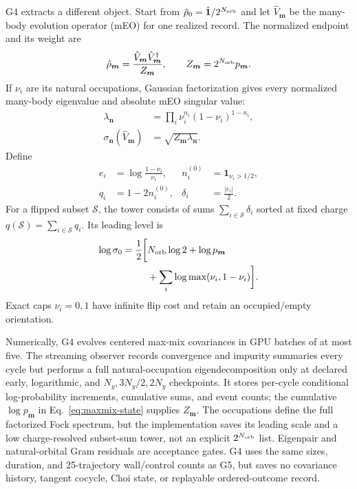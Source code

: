 \documentclass[aps,prx,twocolumn,superscriptaddress,longbibliography,nofootinbib,floatfix]{revtex4-2}
\begin{document}
G4 extracts a different object.  Start from
$\hat\rho_0=\hat{\mathbf{1}}/2^{N_{\rm orb}}$ and let
$\hat V_{\boldsymbol m}$ be the many-body evolution operator (mEO) for one realized
record.  The normalized endpoint and its weight are
\begin{equation}
 \hat\rho_{\boldsymbol m}
 =\frac{\hat V_{\boldsymbol m}\hat V_{\boldsymbol m}^\dagger}{Z_{\boldsymbol m}},
 \qquad
 Z_{\boldsymbol m}=2^{N_{\rm orb}}p_{\boldsymbol m}.
 \label{eq:maxmix-state}
\end{equation}
If $\nu_i$ are its natural occupations, Gaussian factorization gives every normalized
many-body eigenvalue and absolute mEO singular value:
\begin{align}
 \lambda_{\boldsymbol n}
 &=\prod_i\nu_i^{n_i}(1-\nu_i)^{1-n_i},\nonumber\\
 \sigma_{\boldsymbol n}(\hat V_{\boldsymbol m})
 &=\sqrt{Z_{\boldsymbol m}\lambda_{\boldsymbol n}}.
 \label{eq:maxmix-spectrum}
\end{align}
Define
\begin{align}
 e_i&=\log\frac{1-\nu_i}{\nu_i},&n_i^{(0)}&=\mathbf1_{\nu_i>1/2},\nonumber\\
 q_i&=1-2n_i^{(0)},&\delta_i&=\frac{|e_i|}{2}.
 \label{eq:operator-costs}
\end{align}
For a flipped subset $\mathcal S$, the tower consists of sums $\sum_{i\in\mathcal S}\delta_i$
sorted at fixed charge $q(\mathcal S)=\sum_{i\in\mathcal S}q_i$.  Its leading level is
\begin{align}
 \log\sigma_0=\frac12\biggl[&N_{\rm orb}\log2+\log p_{\boldsymbol m}\nonumber\\
 &+\sum_i\log\max(\nu_i,1-\nu_i)\biggr].
 \label{eq:leading-sigma}
\end{align}
Exact caps $\nu_i=0,1$ have infinite flip cost and retain an occupied/empty orientation.

Numerically, G4 evolves centered max-mix covariances in GPU batches of at most five.  The
streaming observer records convergence and impurity summaries every cycle but performs a
full natural-occupation eigendecomposition only at declared early, logarithmic, and
$N_y,3N_y/2,2N_y$ checkpoints.  It stores per-cycle conditional log-probability
increments, cumulative sums, and event counts; the cumulative $\log p_{\boldsymbol m}$ in
Eq.~\eqref{eq:maxmix-state} supplies $Z_{\boldsymbol m}$.  The occupations define the full
factorized Fock spectrum, but the implementation saves its leading scale and a low
charge-resolved subset-sum tower, not an explicit $2^{N_{\rm orb}}$ list.  Eigenpair and
natural-orbital Gram residuals are acceptance gates.  G4 uses the same sizes, duration,
and 25-trajectory wall/control counts as G5, but saves no covariance history, tangent
cocycle, Choi state, or replayable ordered-outcome record.
\end{document}
